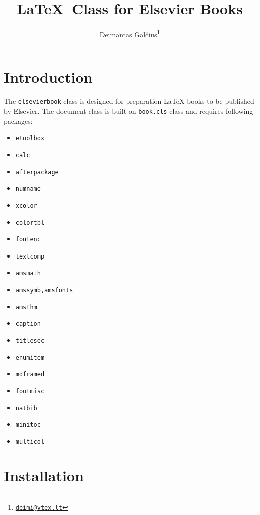 \documentclass{ltxdoc}
\def\file#1{\texttt{#1}}
\begin{document}
\title{\LaTeX\ Class for Elsevier Books}
\author{Deimantas Gal\v{c}ius\footnote{\href{mailto:deimi@vtex.lt}{\texttt{deimi@vtex.lt}}}}
\maketitle
{}

\tableofcontents

\section{Introduction}

The \file{elsevierbook} class is designed for preparation \LaTeX{} books to be published by Elsevier. 
The document class is built on \file{book.cls} class and requires following packages:

\begin{multicols}{2}
\begin{itemize}
\item \file{etoolbox}
\item \file{calc}
\item \file{afterpackage}
\item \file{numname}
\item \file{xcolor}
\item \file{colortbl}
\item \file{fontenc}
\item \file{textcomp}
\item \file{amsmath}
\item \file{amssymb,amsfonts}
\item \file{amsthm}
\item \file{caption}
\item \file{titlesec}
\item \file{enumitem}
\item \file{mdframed}
\item \file{footmisc}
\item \file{natbib}
\item \file{minitoc}
\item \file{multicol}
\end{itemize}
\end{multicols}

\section{Installation}
\end{document}
